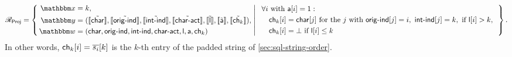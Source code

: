 \begin{displaymath}
\NPRelation_{\mathsf{Proj}} = \left\{\,
  \begin{aligned}
    \NPInstance &= k,\\
    \NPInstancey &= (\Oracle{\MLE{\mathsf{char}}}, \Oracle{\MLE{\mathsf{orig\text{-}ind}}}, \Oracle{\MLE{\mathsf{int\text{-}ind}}}, \Oracle{\MLE{\mathsf{char\text{-}act}}}, \Oracle{\MLE{\mathsf{l}}}, \Oracle{\MLE{\mathsf{a}}}, \Oracle{\MLE{\mathsf{ch}_k}}),\\
    \NPWitness &= (\mathsf{char}, \mathsf{orig\text{-}ind}, \mathsf{int\text{-}ind}, \mathsf{char\text{-}act}, \mathsf{l}, \mathsf{a}, \mathsf{ch}_k)
  \end{aligned}
  \;\middle|\;
  \begin{array}{l}
    \forall i\ \text{with}\ \mathsf{a}[i] = 1: \\[3pt]
    \quad \mathsf{ch}_k[i] = \mathsf{char}[j]\ \text{for the } j \text{ with } \mathsf{orig\text{-}ind}[j] = i,\ \mathsf{int\text{-}ind}[j] = k,\ \text{if } \mathsf{l}[i] > k, \\[3pt]
    \quad \mathsf{ch}_k[i] = \bot\ \text{if } \mathsf{l}[i] \le k
  \end{array}
\,\right\}.
\end{displaymath}
\fi
In other words, $\mathsf{ch}_k[i] = \overline{s_i}[k]$ is the $k$-th entry of the padded string of \cref{sec:sql-string-order}.


